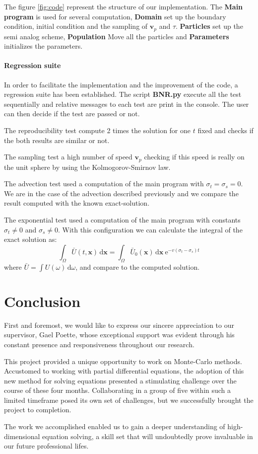 \documentclass[a4paper, 11pt]{article}
\newcommand{\bm}{\symbf}
\newcommand{\di}{\ensuremath{\, \mathrm{d}}}
\newcommand{\e}{\ensuremath{\mathrm{e}}}
\begin{document}
The figure \ref{fig:code} represent the structure of our implementation. The \textbf{Main program} is used for several computation, \textbf{Domain} set up the boundary condition, initial condition and the sampling of $\bm{v}_p$ and $\tau$. \textbf{Particles} set up the semi analog scheme, \textbf{Population} Move all the particles and \textbf{Parameters} initializes the parameters.

\paragraph{Regression suite}

In order to facilitate the implementation and the improvement of the code, a regression suite has been established. The script \textbf{BNR.py} execute all the test sequentially and relative messages to each test are print in the console. The user can then decide if the test are passed or not.

The reproducibility test compute 2 times the solution for one $t$ fixed and checks if the both results are similar or not.

The sampling test a high number of speed $\bm{v}_p$ checking if this speed is really on the unit sphere by using the Kolmogorov-Smirnov law.

The advection test used a computation of the main program with $\sigma_t=\sigma_s=0$. We are in the case of the advection described previously and we compare the result computed with the known exact-solution.

The exponential test used a computation of the main program with constants $\sigma_t \neq 0$ and $\sigma_s \neq 0$. With this configuration we can calculate the integral of the exact solution as:
\[ \int_{\Omega} \bar{U}(t, \bm{x})\di \bm{x}=\int_{\Omega} \bar{U}_0(\bm{x}) \di \bm{x} ~ \e^{-v(\sigma_t-\sigma_s)t} \]
where $\bar{U} = \int U(\omega) \di \omega$, and compare to the computed solution.


\section{Conclusion}

First and foremost, we would like to express our sincere appreciation to our supervisor, Gael Poette, whose exceptional support was evident through his constant presence and responsiveness throughout our research.

This project provided a unique opportunity to work on Monte-Carlo methods. Accustomed to working with partial differential equations, the adoption of this new method for solving equations presented a stimulating challenge over the course of these four months. Collaborating in a group of five within such a limited timeframe posed its own set of challenges, but we successfully brought the project to completion.

The work we accomplished enabled us to gain a deeper understanding of high-dimensional equation solving, a skill set that will undoubtedly prove invaluable in our future professional lifes.
	
	
	
\newpage

\nocite{*}


	
\end{document}
